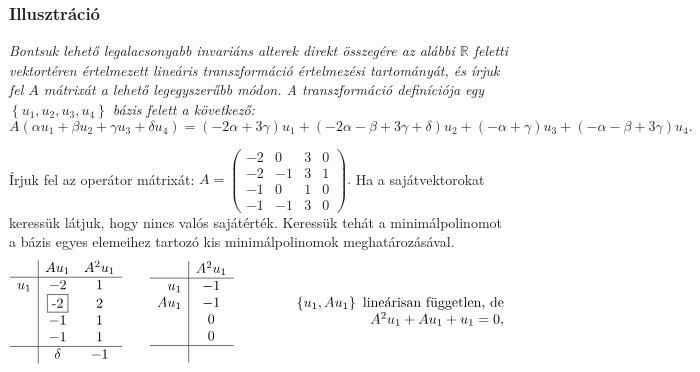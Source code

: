 \documentclass[9pt, a4paper, showtrims]{memoir}
\makeatletter
\renewenvironment{proof}[1][\proofname]
    {\par\pushQED{\qed}%
    \normalfont \topsep6\p@\@plus6\p@\relax
    \trivlist
    \item[\hskip\labelsep
        \itshape
    #1\@addpunct{:}]\ignorespaces}
    {\popQED\endtrivlist\@endpefalse}
\theoremstyle{plain}
\theoremstyle{remark}
\theoremstyle{definition}
\makeatother
\begin{document}
\subsubsection{Illusztráció}
\textit{%
	Bontsuk lehető legalacsonyabb invariáns alterek direkt összegére az alábbi $\mathbb{R}$
	feletti vektortéren értelmezett lineáris transzformáció értelmezési tartományát,
	és írjuk fel $A$ mátrixát a lehető legegyszerűbb módon.
	A transzformáció definíciója egy
	$\left\{
		u_1,u_2,u_3,u_4
		\right\}
	$
	bázis felett a következő:
	\[
		A
		\left(
		\alpha u_1
		+
		\beta u_2
		+
		\gamma u_3
		+
		\delta u_4
		\right)
		=
		\left( -2\alpha + 3\gamma \right)u_1
		+
		\left( -2\alpha-\beta+3\gamma+\delta \right)u_2
		+
		\left( -\alpha+\gamma \right)u_3
		+
		\left( -\alpha-\beta+3\gamma \right)u_4.
	\]
}
\begin{proof}[Megoldás]
	Írjuk fel az operátor mátrixát:
	\(
	A=
	\begin{pmatrix}
		-2 & 0  & 3 & 0 \\
		-2 & -1 & 3 & 1 \\
		-1 & 0  & 1 & 0 \\
		-1 & -1 & 3 & 0
	\end{pmatrix}.
	\)
	Ha a sajátvektorokat keressük látjuk, hogy nincs valós sajátérték.
	Keressük tehát a minimálpolinomot a bázis egyes elemeihez tartozó kis minimálpolinomok
	meghatározásával.
	\[
		\begin{array}{r|cc}
			    & Au_1          & A^2u_1 \\
			\hline
			u_1 & -2            & 1      \\
			    & \framebox{-2} & 2      \\
			    & -1            & 1      \\
			    & -1            & 1      \\
			\hline
			    & \delta        & -1
		\end{array}
		\qquad
		\begin{array}{r|c}
			     & A^2u_1 \\
			\hline
			u_1  & -1     \\
			Au_1 & -1     \\
			     & 0      \\
			     & 0      \\
			\hline
			     &
		\end{array}
		\qquad\qquad
		\begin{array}{r}
			\left\{ u_1,Au_1 \right\}\mbox{ lineárisan független, de} \\
			A^2u_1+Au_1+u_1=0,                                        \\

\end{array}\]
\end{proof}
\end{document}
